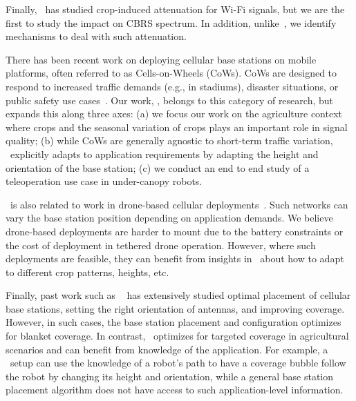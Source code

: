Finally,~\cite{wu2017propagation} has studied crop-induced attenuation for Wi-Fi signals, but we are the first to study the impact on CBRS spectrum. In addition, unlike~\cite{wu2017propagation}, we identify mechanisms to deal with such attenuation.

There has been recent work on deploying cellular base stations on mobile platforms, often referred to as Cells-on-Wheels (CoWs). CoWs are designed to respond to increased traffic demands (e.g., in stadiums), disaster situations, or public safety use cases~\cite{cows1,911now}. Our work, \name, belongs to this category of research, but expands this along three axes: (a) we focus our work on the agriculture context where crops and the seasonal variation of crops plays an important role in signal quality; (b) while CoWs are generally agnostic to short-term traffic variation, \name\ explicitly adapts to application requirements by adapting the height and orientation of the base station; (c) we conduct an end to end study of a teleoperation use case in under-canopy robots. 

\name\ is also related to work in drone-based cellular deployments~\cite{drone_lte_1,dronelte2,dronelte3, kalantari2016number}. Such networks can vary the base station position depending on application demands. We believe drone-based deployments are harder to mount due to the battery constraints or the cost of deployment in tethered drone operation. However, where such deployments are feasible, they can benefit from insights in \name\ about how to adapt to different crop patterns, heights, etc. 


Finally, past work such as ~\cite{antennaradiation,antennatilt,kovsmerl2014base} has extensively studied optimal placement of cellular base stations, setting the right orientation of antennas, and improving coverage. However, in such cases, the base station placement and configuration optimizes for blanket coverage. In contrast, \name\ optimizes for targeted coverage in agricultural scenarios and can benefit from knowledge of the application. For example, a \name\ setup can use the knowledge of a robot's path to have a coverage bubble follow the robot by changing its height and orientation, while a general base station placement algorithm does not have access to such application-level information.








